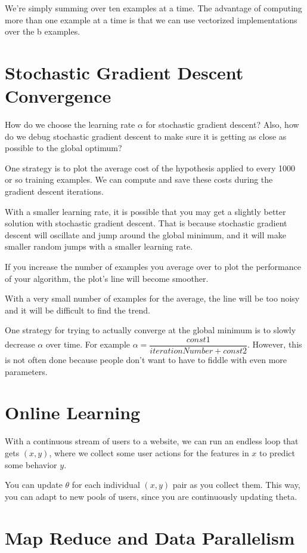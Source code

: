 \documentclass[a4paper,11pt]{report}
\begin{document}
We're simply summing over ten examples at a time. The advantage of computing more than one example at a time is that we can use vectorized implementations over the b examples.

\section{Stochastic Gradient Descent Convergence}

How do we choose the learning rate $\alpha$ for stochastic gradient descent? Also, how do we debug stochastic gradient descent to make sure it is getting as close as possible to the global optimum?

One strategy is to plot the average cost of the hypothesis applied to every 1000 or so training examples. We can compute and save these costs during the gradient descent iterations.

With a smaller learning rate, it is possible that you may get a slightly better solution with stochastic gradient descent. That is because stochastic gradient descent will oscillate and jump around the global minimum, and it will make smaller random jumps with a smaller learning rate.

If you increase the number of examples you average over to plot the performance of your algorithm, the plot's line will become smoother.

With a very small number of examples for the average, the line will be too noisy and it will be difficult to find the trend.

One strategy for trying to actually converge at the global minimum is to slowly decrease $\alpha$ over time. For example $\alpha = \dfrac{const1}{iterationNumber + const2}$.
However, this is not often done because people don't want to have to fiddle with even more parameters.

\section{Online Learning}

With a continuous stream of users to a website, we can run an endless loop that gets $(x,y)$, where we collect some user actions for the features in $x$ to predict some behavior $y$.

You can update $\theta$ for each individual $(x,y)$ pair as you collect them. This way, you can adapt to new pools of users, since you are continuously updating theta.

\section{Map Reduce and Data Parallelism}
\end{document}

